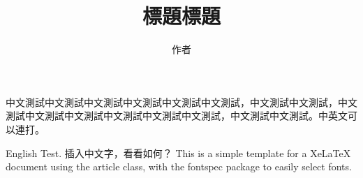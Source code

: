 \documentclass{article}
\title{標題標題}
\author{作者}
\date{} %
\begin{document}
\maketitle
中文測試中文測試中文測試中文測試中文測試中文測試，中文測試中文測試，中文
測試中文測試中文測試中文測試中文測試中文測試，中文測試中文測試。中英文可以連打。

English Test. 插入中文字，看看如何？ This is a simple template for a
XeLaTeX document using the article class, with the fontspec package to
easily select fonts.
\end{document}

